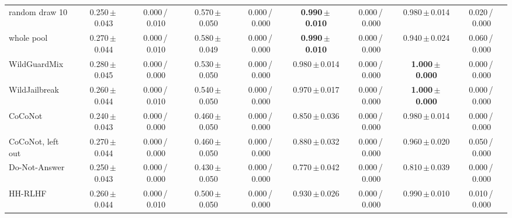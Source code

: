 \begin{tabular}{@{}lcccccccc@{}}
random draw 10 & 0.250\,{\scriptsize$\pm$\,0.043} & {\scriptsize 0.000\,/\,0.010} & 0.570\,{\scriptsize$\pm$\,0.050} & {\scriptsize 0.000\,/\,0.000} & \textbf{0.990\,{\scriptsize$\pm$\,0.010}} & {\scriptsize 0.000\,/\,0.000} & 0.980\,{\scriptsize$\pm$\,0.014} & {\scriptsize 0.020\,/\,0.000} \\
whole pool & 0.270\,{\scriptsize$\pm$\,0.044} & {\scriptsize 0.000\,/\,0.010} & 0.580\,{\scriptsize$\pm$\,0.049} & {\scriptsize 0.000\,/\,0.000} & \textbf{0.990\,{\scriptsize$\pm$\,0.010}} & {\scriptsize 0.000\,/\,0.000} & 0.940\,{\scriptsize$\pm$\,0.024} & {\scriptsize 0.060\,/\,0.000} \\
WildGuardMix & 0.280\,{\scriptsize$\pm$\,0.045} & {\scriptsize 0.000\,/\,0.000} & 0.530\,{\scriptsize$\pm$\,0.050} & {\scriptsize 0.000\,/\,0.000} & 0.980\,{\scriptsize$\pm$\,0.014} & {\scriptsize 0.000\,/\,0.000} & \textbf{1.000\,{\scriptsize$\pm$\,0.000}} & {\scriptsize 0.000\,/\,0.000} \\
WildJailbreak & 0.260\,{\scriptsize$\pm$\,0.044} & {\scriptsize 0.000\,/\,0.010} & 0.540\,{\scriptsize$\pm$\,0.050} & {\scriptsize 0.000\,/\,0.000} & 0.970\,{\scriptsize$\pm$\,0.017} & {\scriptsize 0.000\,/\,0.000} & \textbf{1.000\,{\scriptsize$\pm$\,0.000}} & {\scriptsize 0.000\,/\,0.000} \\
CoCoNot & 0.240\,{\scriptsize$\pm$\,0.043} & {\scriptsize 0.000\,/\,0.000} & 0.460\,{\scriptsize$\pm$\,0.050} & {\scriptsize 0.000\,/\,0.000} & 0.850\,{\scriptsize$\pm$\,0.036} & {\scriptsize 0.000\,/\,0.000} & 0.980\,{\scriptsize$\pm$\,0.014} & {\scriptsize 0.000\,/\,0.000} \\
CoCoNot, left out & 0.270\,{\scriptsize$\pm$\,0.044} & {\scriptsize 0.000\,/\,0.000} & 0.460\,{\scriptsize$\pm$\,0.050} & {\scriptsize 0.000\,/\,0.000} & 0.880\,{\scriptsize$\pm$\,0.032} & {\scriptsize 0.000\,/\,0.000} & 0.960\,{\scriptsize$\pm$\,0.020} & {\scriptsize 0.050\,/\,0.000} \\
Do-Not-Answer & 0.250\,{\scriptsize$\pm$\,0.043} & {\scriptsize 0.000\,/\,0.000} & 0.430\,{\scriptsize$\pm$\,0.050} & {\scriptsize 0.000\,/\,0.000} & 0.770\,{\scriptsize$\pm$\,0.042} & {\scriptsize 0.000\,/\,0.000} & 0.810\,{\scriptsize$\pm$\,0.039} & {\scriptsize 0.000\,/\,0.000} \\
HH-RLHF & 0.260\,{\scriptsize$\pm$\,0.044} & {\scriptsize 0.000\,/\,0.010} & 0.500\,{\scriptsize$\pm$\,0.050} & {\scriptsize 0.000\,/\,0.000} & 0.930\,{\scriptsize$\pm$\,0.026} & {\scriptsize 0.000\,/\,0.000} & 0.990\,{\scriptsize$\pm$\,0.010} & {\scriptsize 0.010\,/\,0.000} \\

\end{tabular}
